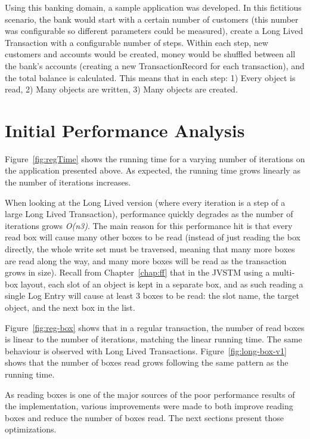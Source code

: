 Using this banking domain, a sample application was developed. In this
fictitious scenario, the bank would start with a certain number of
customers (this number was configurable so different parameters could
be measured), create a Long Lived Transaction with a configurable
number of steps. Within each step, new customers and accounts would be
created, money would be shuffled between all the bank's accounts
(creating a new TransactionRecord for each transaction), and the total
balance is calculated. This means that in each step: 1) Every object
is read, 2) Many objects are written, 3) Many objects are created.

\section{Initial Performance Analysis}

Figure~\ref{fig:regTime} shows the running time for a varying number
of iterations on the application presented above. As expected, the
running time grows linearly as the number of iterations increases.

When looking at the Long Lived version (where every iteration is a
step of a large Long Lived Transaction), performance quickly degrades
as the number of iterations grows {\it O(n3)}. The main reason for
this performance hit is that every read box will cause many other
boxes to be read (instead of just reading the box directly, the whole
write set must be traversed, meaning that many more boxes are read
along the way, and many more boxes will be read as the transaction
grows in size). Recall from Chapter~\ref{chap:ff} that in the JVSTM
using a multi-box layout, each slot of an object is kept in a separate
box, and as such reading a single Log Entry will cause at least 3
boxes to be read: the slot name, the target object, and the next box
in the list.

Figure~\ref{fig:reg-box} shows that in a regular transaction, the
number of read boxes is linear to the number of iterations, matching
the linear running time. The same behaviour is observed with Long
Lived Transactions. Figure~\ref{fig:long-box-v1} shows that the number
of boxes read grows following the same pattern as the running time.

As reading boxes is one of the major sources of the poor performance
results of the implementation, various improvements were made to both
improve reading boxes and reduce the number of boxes read. The next
sections present those optimizations.

